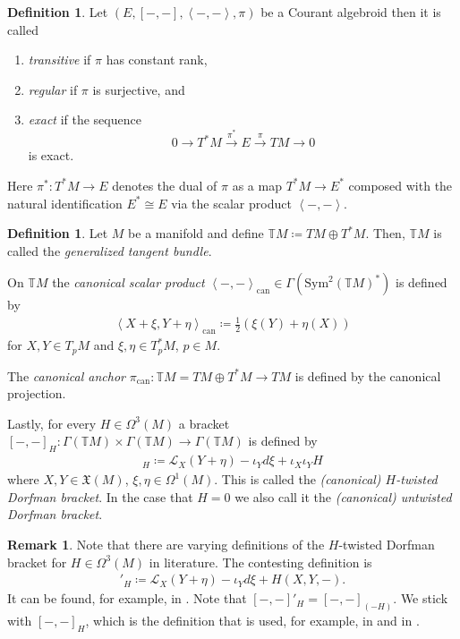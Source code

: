 \documentclass[12pt,a4paper]{article}
\theoremstyle{plain}
\theoremstyle{definition}
\newtheorem{definition}[theorem]{Definition}
\newtheorem{remark}[theorem]{Remark}
\newcommand{\scal}[2]{\left\langle #1,#2\right\rangle}
\newcommand{\VFs}{\mathfrak{X}(M)}
\newcommand{\Forms}[1]{\Omega^{#1}(M)}
\newcommand{\LieD}{\mathcal{L}}
\begin{document}
\begin{definition}
Let $(E,[-,-],\scal{-}{-},\pi)$ be a Courant algebroid then it is called
\begin{enumerate}
    \item \textit{transitive} if $\pi$ has constant rank,
    \item \textit{regular} if $\pi$ is surjective, and
    \item \textit{exact} if the sequence $$0\to T^*M\xrightarrow{\pi^*}E\xrightarrow{\pi} TM\to 0$$ is exact.
\end{enumerate}
Here $\pi^*:T^*M\to E$ denotes the dual of $\pi$ as a map $T^*M\to E^*$ composed with the natural identification $E^*\cong E$ via the scalar product $\scal{-}{-}$.
\end{definition}

\begin{definition}
\label{Def:GenTanBund}
Let $M$ be a manifold and define $\mathbb{T}M\coloneqq TM\oplus T^*M$. Then, $\mathbb{T}M$ is called the \textit{generalized tangent bundle}. 

On $\mathbb{T}M$ the \textit{canonical scalar product} $\scal{-}{-}_{\mathrm{can}}\in \Gamma(\mathrm{Sym}^2(\mathbb{T}M)^*)$ is defined by
\begin{align*}
    \scal{X+\xi}{Y+\eta}_{\mathrm{can}}\coloneqq \frac{1}{2}(\xi(Y)+\eta(X))
\end{align*}
for $X,Y\in T_pM$ and $\xi,\eta\in T_p^*M$, $p\in M$.

The \textit{canonical anchor} $\pi_{\mathrm{can}}:\mathbb TM= TM\oplus T^*M\to TM$ is defined by the canonical projection.

Lastly, for every $H\in \Forms{3}$ a bracket $[-,-]_H:\Gamma(\mathbb TM)\times\Gamma(\mathbb TM)\to \Gamma(\mathbb TM)$ is defined by
\begin{align*}
    [X+\xi,Y+\eta]_H\coloneqq \LieD_X(Y+\eta)-\iota_Y d\xi + \iota_X\iota_YH
\end{align*}
where $X,Y\in \VFs$, $\xi,\eta \in \Forms{1}$. This is called the \textit{(canonical) $H$-twisted Dorfman bracket}. In the case that $H=0$ we also call it the \textit{(canonical) untwisted Dorfman bracket}.
\end{definition}

\begin{remark}
\label{Rem:DifferentH-twisted}
Note that there are varying definitions of the $H$-twisted Dorfman bracket for $H\in \Forms{3}$ in literature. The contesting definition is 
\begin{align*}
    [X+\xi,Y+\eta]'_H\coloneqq \LieD_X(Y+\eta)-\iota_Y d\xi + H(X,Y,-).
\end{align*}
It can be found, for example, in \cite{severa2001poissongeometry3formbackground}. Note that $[-,-]'_H=[-,-]_{(-H)}$. We stick with $[-,-]_H$, which is the definition that is used, for example, in \cite{gualtieriAnn} and in \cite{RubioTipler}.
\end{remark}
\end{document}
